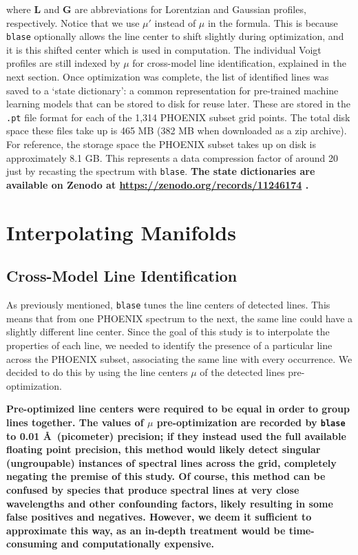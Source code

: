 \documentclass[twocolumn, linenumbers]{aastex631}
\begin{document}
where $\mathbf{L}$ and $\mathbf{G}$ are abbreviations for Lorentzian and Gaussian profiles, respectively.
Notice that we use $\mu'$ instead of $\mu$ in the formula.
This is because \texttt{blase} optionally allows the line center to shift slightly during optimization, and it is this shifted center which is used in computation.
The individual Voigt profiles are still indexed by $\mu$ for cross-model line identification, explained in the next section.
Once optimization was complete, the list of identified lines was saved to a `state dictionary': a common representation for pre-trained machine learning models that can be stored to disk for reuse later.
These are stored in the \texttt{.pt} file format for each of the 1,314 PHOENIX subset grid points.
The total disk space these files take up is 465 MB (382 MB when downloaded as a zip archive).
For reference, the storage space the PHOENIX subset takes up on disk is approximately 8.1 GB.
This represents a data compression factor of around 20 just by recasting the spectrum with \texttt{blase}.
\textbf{The state dictionaries are available on Zenodo at \url{https://zenodo.org/records/11246174} \citep{zenodo}.}

\section{Interpolating Manifolds}
\label{sec:section3}
\subsection{Cross-Model Line Identification}
As previously mentioned, \texttt{blase} tunes the line centers of detected lines.
This means that from one PHOENIX spectrum to the next, the same line could have a slightly different line center.
Since the goal of this study is to interpolate the properties of each line, we needed to identify the presence of a particular line across the PHOENIX subset, associating the same line with every occurrence.
We decided to do this by using the line centers $\mu$ of the detected lines pre-optimization.

\textbf{Pre-optimized line centers were required to be equal in order to group lines together.
The values of $\mu$ pre-optimization are recorded by \texttt{blase} to 0.01 \AA \ (picometer) precision; if they instead used the full available floating point precision, this method would likely detect singular (ungroupable) instances of spectral lines across the grid, completely negating the premise of this study.
Of course, this method can be confused by species that produce spectral lines at very close wavelengths and other confounding factors, likely resulting in some false positives and negatives.
However, we deem it sufficient to approximate this way, as an in-depth treatment would be time-consuming and computationally expensive.}
\end{document}
